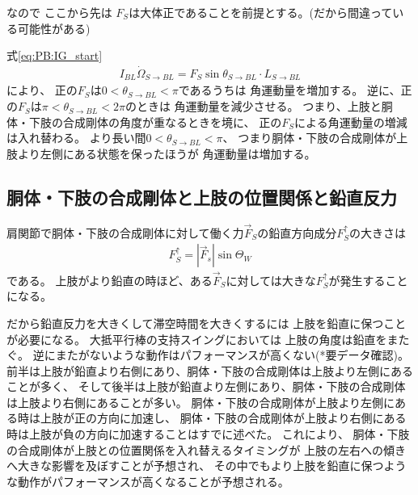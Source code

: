 \documentclass[a4paper,11pt]{jsarticle}
\begin{document}
なので
ここから先は
$F_S$は大体正であることを前提とする。(だから間違っている可能性がある)

式\ref{eq:PB:IG_start}
\begin{align*}
  I_{BL}\dot\Omega_{S\rightarrow BL}{} = F_S \sin\theta_{S\rightarrow BL} \cdot L_{S\rightarrow BL}
\end{align*}
により、
正の$F_S$は$0 < \theta_{S\rightarrow BL} < \pi$であるうちは
角運動量を増加する。
逆に、正の$F_S$は$\pi < \theta_{S\rightarrow BL} < 2\pi$のときは
角運動量を減少させる。
つまり、上肢と胴体・下肢の合成剛体の角度が重なるときを境に、
正の$F_S$による角運動量の増減は入れ替わる。
より長い間$0 < \theta_{S\rightarrow BL} < \pi$、
つまり胴体・下肢の合成剛体が上肢より左側にある状態を保ったほうが
角運動量は増加する。

\subsection{胴体・下肢の合成剛体と上肢の位置関係と鉛直反力}
肩関節で胴体・下肢の合成剛体に対して働く力$\vec{F}_S$の鉛直方向成分$F_{S}^\uparrow$の大きさは
\begin{align*}
  F_{S}^\uparrow = \left|\vec{F}_s\right|\sin\Theta_W
\end{align*}
である。
上肢がより鉛直の時ほど、ある$\vec{F}_S$に対しては大きな$F_{S}^\uparrow$が発生することになる。

だから鉛直反力を大きくして滞空時間を大きくするには
上肢を鉛直に保つことが必要になる。
大抵平行棒の支持スイングにおいては
上肢の角度は鉛直をまたぐ。
逆にまたがないような動作はパフォーマンスが高くない(*要データ確認)。
前半は上肢が鉛直より右側にあり、胴体・下肢の合成剛体は上肢より左側にあることが多く、
そして後半は上肢が鉛直より左側にあり、胴体・下肢の合成剛体は上肢より右側にあることが多い。
胴体・下肢の合成剛体が上肢より左側にある時は上肢が正の方向に加速し、
胴体・下肢の合成剛体が上肢より右側にある時は上肢が負の方向に加速することはすでに述べた。
これにより、
胴体・下肢の合成剛体が上肢との位置関係を入れ替えるタイミングが
上肢の左右への傾きへ大きな影響を及ぼすことが予想され、
その中でもより上肢を鉛直に保つような動作がパフォーマンスが高くなることが予想される。
\end{document}
